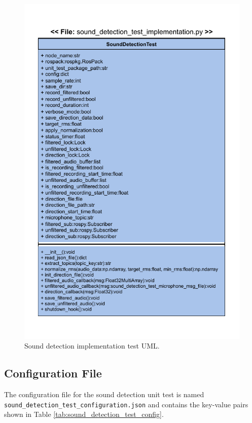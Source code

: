 \documentclass{CSSRforAfrica}
\begin{document}
\begin{figure}[!hbpt]
	\centering
	\includegraphics[scale=1.0]{images/Sound_detection_test_implementation.pdf}
	\caption{Sound detection implementation test UML.}
	\label{fig:sound_implementation_test_UML}
\end{figure}

\subsection*{Configuration File}
The configuration file for the sound detection unit test is named \\
\texttt{sound\_detection\_test\_configuration.json} and contains the key-value pairs shown in Table \ref{tab:sound_detection_test_config}.
\end{document}
